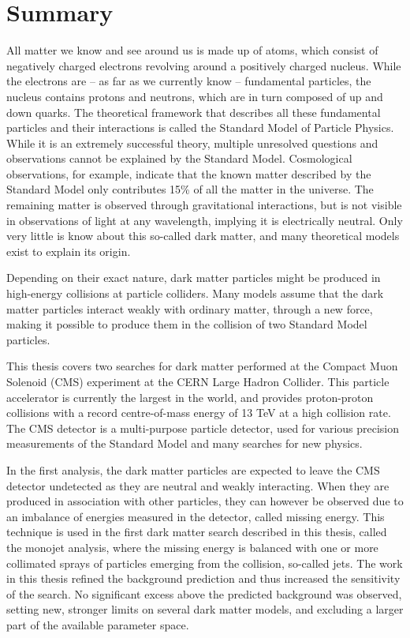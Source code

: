 
\chapter*{Summary}

All matter we know and see around us is made up of atoms, which consist of negatively charged electrons revolving around a positively charged nucleus. While the electrons are -- as far as we currently know -- fundamental particles, the nucleus contains protons and neutrons, which are in turn composed of up and down quarks. The theoretical framework that describes all these fundamental particles and their interactions is called the Standard Model of Particle Physics.  While it is an extremely successful theory, multiple unresolved questions and observations cannot be explained by the Standard Model. Cosmological observations, for example, indicate that the known matter described by the Standard Model only contributes 15\% of all the matter in the universe. The remaining matter is observed through gravitational interactions, but is not visible in observations of light at any wavelength, implying it is electrically neutral. Only very little is know about this so-called dark matter, and many theoretical models exist to explain its origin.

Depending on their exact nature, dark matter particles might be produced in high-energy collisions at particle colliders. Many models assume that the dark matter particles interact weakly with ordinary matter, through a new force, making it possible to produce them in the collision of two Standard Model particles. 

This thesis covers two searches for dark matter performed at the Compact Muon Solenoid (CMS) experiment at the CERN Large Hadron Collider. This particle accelerator is currently the largest in the world, and provides proton-proton collisions with a record centre-of-mass energy of 13 TeV at a high collision rate. The CMS detector is a multi-purpose particle detector, used for various precision measurements of the Standard Model and many searches for new physics.

In the first analysis, the dark matter particles are expected to leave the CMS detector undetected as they are neutral and weakly interacting. When they are produced in association with other particles, they can however be observed due to an imbalance of energies measured in the detector, called missing energy. This technique is used in the first dark matter search described in this thesis, called the monojet analysis, where the missing energy is balanced with one or more collimated sprays of particles emerging from the collision, so-called jets. The work in this thesis refined the background prediction and thus increased the sensitivity of the search. No significant excess above the predicted background was observed, setting new, stronger limits on several dark matter models, and excluding a larger part of the available parameter space.

